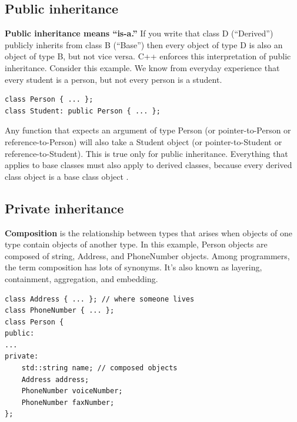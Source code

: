 \documentclass[a4paper,12pt,notitlepage]{article}
\begin{document}

\subsection{Public inheritance}

\noindent
\textbf{Public inheritance means “is-a.”} If you write that class D (“Derived”) publicly inherits from class B (“Base”) then every object of type D is also an object of type B, but not vice versa. C++ enforces this 
interpretation of public inheritance. Consider this example. We know from everyday experience that every 
student is a person, but not every person is a student.

\begin{verbatim}
class Person { ... };
class Student: public Person { ... };
\end{verbatim}

\noindent
Any function that expects an argument of type Person (or pointer-to-Person or reference-to-Person) will also 
take a Student object (or pointer-to-Student or reference-to-Student). This is true only for public inheritance. Everything that applies to base classes must also apply to derived classes, because every derived
class object is a base class object \cite{Meyers_eff}.


\subsection{Private inheritance}

\noindent
{\bf Composition} is the relationship between types that arises when objects of one type contain objects of another type. In this example, Person objects are composed of string, Address, and PhoneNumber objects. Among programmers, the term composition has lots of synonyms. It's also known as layering, containment, aggregation, and embedding.

\begin{verbatim}
class Address { ... }; // where someone lives 
class PhoneNumber { ... };
class Person {
public:
...
private:
    std::string name; // composed objects
    Address address;
    PhoneNumber voiceNumber;
    PhoneNumber faxNumber;
};
\end{verbatim}
\end{document}
